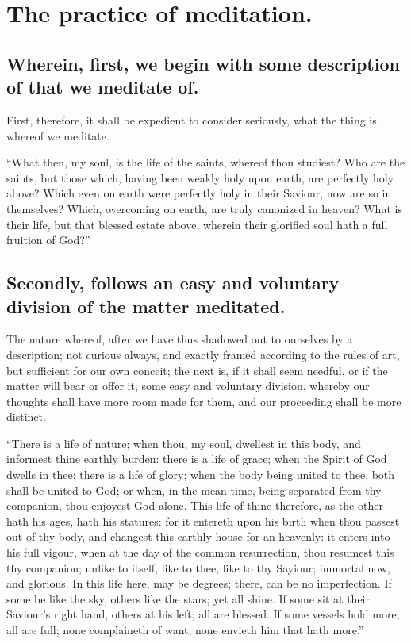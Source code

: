 \chapter{The practice of meditation.}
\section{Wherein, first, we begin with some description of that we meditate of.}
First, therefore, it shall be expedient to consider seriously, what the thing is whereof we meditate. 

``What then, my soul, is the life of the saints, whereof thou studiest? Who are the saints, but those which, having been weakly holy upon earth, are perfectly holy above? Which even on earth were perfectly holy in their Saviour, now are so in themselves? Which, overcoming on earth, are truly canonized in heaven? What is their life, but that blessed estate above, wherein their glorified soul hath a full fruition of God?'' 

\section{Secondly, follows an easy and voluntary division of the matter meditated.}

The nature whereof, after we have thus shadowed out to ourselves by a description; not curious always, and exactly framed according to the rules of art, but sufficient for our own conceit; the next is, if it shall seem needful, or if the matter will bear or offer it, some easy and voluntary division, whereby our thoughts shall have more room made for them, and our proceeding shall be more distinct. 

``There is a life of nature; when thou, my soul, dwellest in this body, and informest thine earthly burden: there is a life of grace; when the Spirit of God dwells in thee: there is a life of glory; when the body being united to thee, both shall be united to God; or when, in the mean time, being separated from thy companion, thou enjoyest God alone. This life of thine therefore, as the other hath his ages, hath his statures: for it entereth upon his birth when thou passest out of thy body, and changest this earthly house for an heavenly: it enters into his full vigour, when at the day of the common resurrection, thou resumest this thy companion; unlike to itself, like to thee, like to thy Sayiour; immortal now, and glorious. In this life here, may be degrees; there, can be no imperfection. If some be like the sky, others like the stars; yet all shine. If some sit at their Saviour's right hand, others at his left; all are blessed. If some vessels hold more, all are full; none complaineth of want, none envieth him that hath more.''

